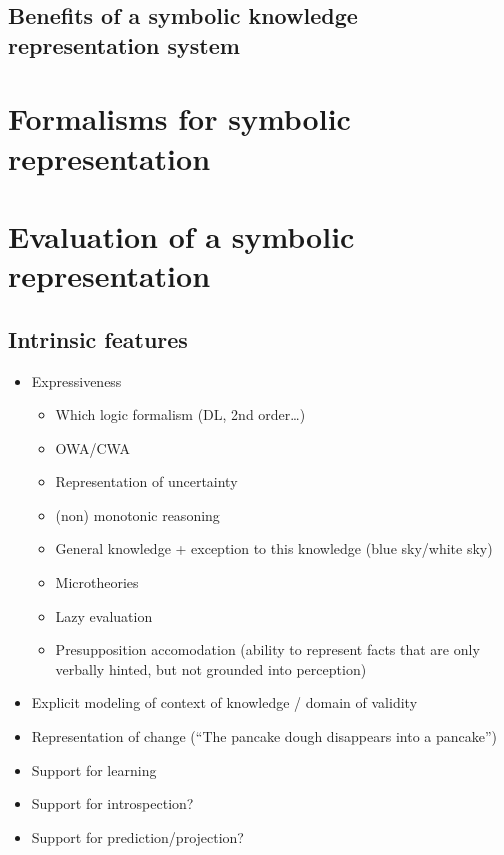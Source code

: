 \subsection{Benefits of a symbolic knowledge representation system}
\label{subssect|krs-benefits}


\section{Formalisms for symbolic representation}
\label{sect|formalisms}

\section{Evaluation of a symbolic representation }
\label{sect|krs-evaluation}


\subsection{Intrinsic features}
\label{sect|eval-intrinsic-features}

\begin{itemize}
	\item Expressiveness
	\begin{itemize}
		\item Which logic formalism (DL, 2nd order…)
		\item OWA/CWA
		\item Representation of uncertainty
		\item (non) monotonic reasoning
		\item General knowledge + exception to this knowledge (blue sky/white sky)
		\item Microtheories
		\item Lazy evaluation
		\item Presupposition accomodation (ability to represent facts that are only verbally hinted, but not grounded into perception)
	\end{itemize}
    \item Explicit modeling of context of knowledge / domain of validity
    \item Representation of change (“The pancake dough disappears into a pancake”)
    \item Support for learning
    \item Support for introspection?
    \item Support for prediction/projection?
\end{itemize}

